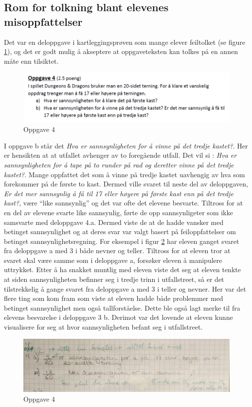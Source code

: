 \documentclass[main.tex]{subfiles}
\begin{document}
\subsection*{Rom for tolkning blant elevenes misoppfattelser}
Det var en deloppgave i kartleggingsprøven som mange elever feiltolket (se figure \ref{fig:oppgave4}), og det er 
godt mulig å akseptere at oppgaveteksten kan tolkes på en annen måte enn tilsiktet.
\begin{figure}[h!]
\centering
\includegraphics[scale = 0.6]{../figures/oppgave4b.png}
\caption{Oppgave 4}
\label{fig:oppgave4}
\end{figure}
I oppgave b står det \emph{Hva er sannsynligheten for å vinne på det tredje kastet?}. Her er hensikten at
at utfallet avhenger av to foregående utfall. Det vil si : \emph{Hva er sannsynligheten for å 
tape på to runder på rad og deretter vinne på det tredje kastet?}. Mange oppfattet det som å vinne på tredje kastet 
uavhengig av hva som forekommer på de første to kast. Dermed ville svaret til neste del av deloppgaven, \emph{Er det mer 
sannsynlig å få til 17 eller høyere på første kast enn på det tredje kast?},  være ``like sannsynlig'' og det var ofte 
det elevene besvarte. Tiltross for at en del av elevene svarte like sannsynlig, førte de opp sannsynligeter som 
ikke samsvarte med deloppgave 4.a. Dermed viste de at de hadde vansker med betinget sannsynlighet og at deres svar var 
valgt basert på feiloppfattelser om betinget sannsynlighetsregning. For eksempel i figur \ref{fig:maria} har eleven 
ganget svaret fra deloppgave a med 3 i både nevner og teller. Tiltross for at eleven tror at svaret skal være samme som 
i deloppgave a, forsøker eleven å manipulere uttrykket. Etter å ha snakket muntlig med eleven viste det seg at eleven 
tenkte at siden sannsynligheten befinner seg i tredje trinn i utfallstreet, så er det tilstrekkelig å gange svaret fra 
deloppgave a med 3 i teller og nevner. Her var det flere ting som kom fram som viste at eleven hadde både problemmer
med betinget sannsynlighet men også tallforståelse. Dette ble også lagt merke til fra elevens besvarelse i deloppgave 3 
b. Derimot var det lovende at eleven kunne visualisere for seg at hvor sannsynligheten befant seg i utfallstreet. 
\begin{figure}[h!]
\centering
\includegraphics[scale = 0.3]{../figures/maria.png}
\caption{Oppgave 4}
\label{fig:maria}
\end{figure}
\end{document}
